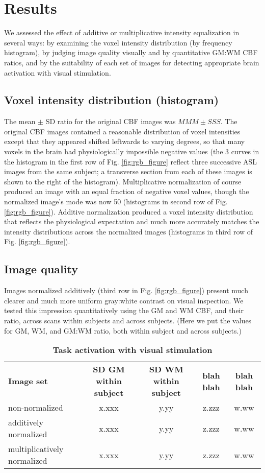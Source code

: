 \section{Results}
We assessed the effect of additive or multiplicative intensity equalization in several ways: by examining the voxel intensity distribution (by frequency histogram), by judging image quality visually and by quantitative GM:WM CBF ratios, and by the suitability of each set of images for detecting appropriate brain activation with visual stimulation.

\subsection{Voxel intensity distribution (histogram)}
The mean $\pm$ SD ratio for the original CBF images was $MMM \pm SSS$. The original CBF images contained a reasonable distribution of voxel intensities except that they appeared shifted leftwards to varying degrees, so that many voxels in the brain had physiologically impossible negative values (the 3 curves in the histogram in the first row of Fig. \ref{fig:rgb_figure} reflect three successive ASL images from the same subject; a transverse section from each of these images is shown to the right of the histogram). Multiplicative normalization of course produced an image with an equal fraction of negative voxel values, though the normalized image's mode was now 50 (histograms in second row of Fig. \ref{fig:rgb_figure}). Additive normalization produced a voxel intensity distribution that reflects the physiological expectation and much more accurately matches the intensity distributions across the normalized images (histograms in third row of Fig. \ref{fig:rgb_figure}). 

\subsection{Image quality}
Images normalized additively (third row in Fig. \ref{fig:rgb_figure}) present much clearer and much more uniform gray:white contrast on visual inspection. We tested this impression quantitatively using the GM and WM CBF, and their ratio, across scans within subjects and across subjects. (Here we put the values for GM, WM, and GM:WM ratio, both within subject and across subjects.)

\begin{table}
\begin{tabular}{lcccc}
  \textbf{Image set} & \textbf{SD GM within subject} & \textbf{SD WM within subject} & \textbf{blah blah} & \textbf{blah blah} \\
  non-normalized & x.xxx & y.yy & z.zzz & w.ww \\
  additively normalized & x.xxx & y.yy & z.zzz & w.ww \\
  multiplicatively normalized & x.xxx & y.yy & z.zzz & w.ww \\
\end{tabular}
\caption{\textbf{Task activation with visual stimulation}}
\label{table:taskVOI}
\end{table}

